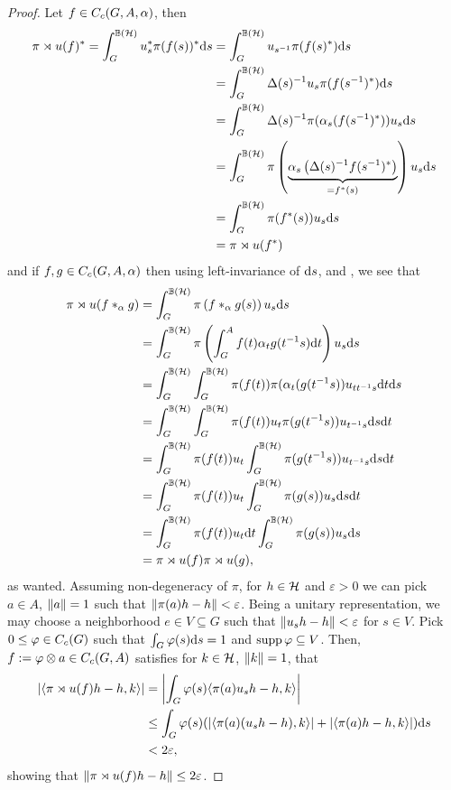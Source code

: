 \begin{proof}
	Let $f \in C_c(G,A,\alpha)$, then
	\begin{align*}
		\pi \rtimes u(f)^* = \int_G^{\mathbb{B}(\mathcal{H})}  u_s^* \pi(f(s))^* \mathrm{d} s &= \int_G^{\mathbb{B}(\mathcal{H})} u_{s^{-1}} \pi(f(s)^*) \mathrm{d} s\\
		&= \int_G^{\mathbb{B}(\mathcal{H})} \Delta(s)^{-1} u_{s} \pi(f(s^{-1})^*) \mathrm{d} s \\
		&= \int_G^{\mathbb{B}(\mathcal{H})} \Delta(s)^{-1} \pi(\alpha_s(f(s^{-1})^*)) u_s \mathrm{d} s\\
		&= \int_G^{\mathbb{B}(\mathcal{H})} \pi\left( \underbrace{\alpha_s\left( \Delta(s)^{-1}f(s^{-1})^* \right)}_{=f^*(s)} \right) u_s \mathrm{d} s\\
		&= \int_G^{\mathbb{B}(\mathcal{H})} \pi(f^*(s)) u_s \mathrm{d} s\\
		&= \pi \rtimes u(f^*)
	\end{align*}
	and if $f,g \in C_c(G,A,\alpha)$ then using left-invariance of $\mathrm{d} s$,  and , we see that
	\begin{align*}
		\pi \rtimes u(f\ast_{\alpha}g) &= \int_G^{\mathbb{B}(\mathcal{H})} \pi \left( f \ast_\alpha g(s) \right)u_s \mathrm{d} s\\
		&= \int_G^{\mathbb{B}(\mathcal{H})} \pi\left( \int_G^A f(t) \alpha_t g(t^{-1}s) \mathrm{d} t \right)u_s \mathrm{d} s\\
		&= \int_G^{\mathbb{B}(\mathcal{H})}\int_G^{\mathbb{B}(\mathcal{H})} \pi(f(t)) \pi(\alpha_t(g(t^{-1}s))u_{t t^{-1}s} \mathrm{d} t \mathrm{d} s\\
		&= \int_G^{\mathbb{B}(\mathcal{H})} \int_G ^{\mathbb{B}(\mathcal{H})} \pi(f(t)) u_t \pi(g(t^{-1}s)) u_{t^{-1}s}\mathrm{d} s \mathrm{d} t\\
		&= \int_G^{\mathbb{B}(\mathcal{H})} \pi(f(t)) u_t \int_G^{\mathbb{B}(\mathcal{H})} \pi(g(t^{-1}s )) u_{t^{-1}s} \mathrm{d} s \mathrm{d} t\\
		&= \int_G ^{\mathbb{B}(\mathcal{H})} \pi(f(t)) u_t \int_G ^{\mathbb{B}(\mathcal{H})} \pi(g(s)) u_s \mathrm{d} s \mathrm{d} t\\
		&= \int_G ^{\mathbb{B}(\mathcal{H})} \pi(f(t)) u_t \mathrm{d} t \int_G ^{\mathbb{B}(\mathcal{H})} \pi(g(s)) u_s \mathrm{d} s \\
		&= \pi \rtimes u (f) \pi\rtimes u (g),
	\end{align*}
	as wanted. Assuming non-degeneracy of $\pi$, for $h \in \mathcal{H}$ and $\varepsilon>0$ we can pick $a \in A$, $\left\lVert a \right\rVert =1$ such that $\left\lVert \pi(a) h - h \right\rVert < \varepsilon$. Being a unitary representation, we may choose a neighborhood $e \in V \subseteq G$ such that $\left\lVert u_s h - h\right\rVert < \varepsilon$ for $s \in V$. Pick $0 \leq \varphi \in C_c(G)$ such that $\int_G \varphi(s) \mathrm{d} s = 1$ and $\operatorname{supp} \varphi \subseteq V$. Then, $f := \varphi \otimes a \in C_c(G,A)$ satisfies for $k \in \mathcal{H}$, $\left\lVert k \right\rVert = 1$, that
	\begin{align*}
	\left| \langle \pi \rtimes u(f)h-h,k\rangle \right| &= 	\left| \int_G \varphi(s) \langle \pi(a)u_s h-h,k \rangle\right|\\
	& \leq \int_G \varphi(s) (|\langle \pi(a) (u_s h-h),k\rangle|+|\langle \pi(a)h-h,k\rangle| ) \mathrm{d} s \\
	&< 2 \varepsilon,
	\end{align*}
	showing that $\left\lVert \pi \rtimes u(f)h-h\right\rVert \leq 2 \varepsilon$.
\end{proof}

